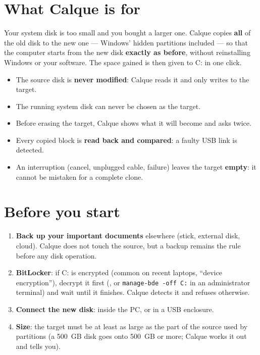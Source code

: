 \tableofcontents
\newpage

\section{What Calque is for}

Your system disk is too small and you bought a larger one. Calque copies \textbf{all} of the old disk
to the new one — Windows' hidden partitions included — so that the computer starts from the new disk
\textbf{exactly as before}, without reinstalling Windows or your software. The space gained is then
given to C: in one click.

\begin{securitebox}
\begin{itemize}
\item The source disk is \textbf{never modified}: Calque reads it and only writes to the target.
\item The running system disk can never be chosen as the target.
\item Before erasing the target, Calque shows what it will become and asks twice.
\item Every copied block is \textbf{read back and compared}: a faulty USB link is detected.
\item An interruption (cancel, unplugged cable, failure) leaves the target \textbf{empty}: it cannot be
      mistaken for a complete clone.
\end{itemize}
\end{securitebox}

\section{Before you start}

\begin{enumerate}
\item \textbf{Back up your important documents} elsewhere (stick, external disk, cloud). Calque does not
      touch the source, but a backup remains the rule before any disk operation.
\item \textbf{BitLocker}: if C: is encrypted (common on recent laptops, “device encryption”), decrypt it
      first (, or \texttt{manage-bde -off C:} in
      an administrator terminal) and wait until it finishes. Calque detects it and refuses otherwise.
\item \textbf{Connect the new disk}: inside the PC, or in a USB enclosure.
\item \textbf{Size}: the target must be at least as large as the part of the source used by
      partitions (a 500~GB disk goes onto 500~GB or more; Calque works it out and tells you).
\end{enumerate}

